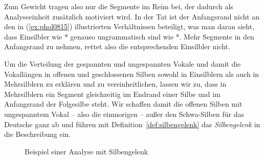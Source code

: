 Zum Gewicht tragen also nur die Segmente im Reim bei, der dadurch als Analyseeinheit zusätzlich motiviert wird.
In der Tat ist der Anfangsrand nicht an den in (\ref{ex:phol0815}) illustrierten Verhältnissen beteiligt, was man daran sieht, dass Einsilbler wie *\textipa{[knI]} genauso ungrammatisch sind wie *\textipa{[kI]}.
Mehr Segmente in den Anfangsrand zu nehmen, rettet also die entsprechenden Einsilbler nicht.

Um die Verteilung der gespannten und ungespannten Vokale und damit die Vokallängen in offenen und geschlossenen Silben sowohl in Einsilblern als auch in Mehrsilblern zu erklären und zu vereinheitlichen, lassen wir zu, dass in Mehrsilblern ein Segment gleichzeitig im Endrand einer Silbe und im Anfangsrand der Folgesilbe steht.
Wir schaffen damit die offenen Silben mit ungespanntem Vokal -- also die einmorigen -- außer den Schwa-Silben für das Deutsche ganz ab und führen mit Definition~\ref{def:silbengelenk} das \textit{Silbengelenk} in die Beschreibung ein.


\begin{figure}
  \centering
  \caption{Beispiel einer Analyse mit Silbengelenk}
  \label{fig:silbgel001}
\end{figure}

